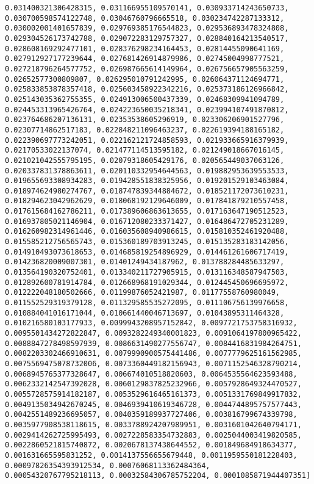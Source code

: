 \documentclass[11pt]{article}
\begin{document}
\begin{Verbatim}[commandchars=\\\{\}]
0.031400321306428315, 0.031166955109570141, 0.030933714243650733, 0.030700598574122748, 0.03046760796665518, 0.030234742287133312, 0.030002001401657839, 0.029769385176544823, 0.029536893478324808, 0.029304526173742788, 0.029072283129757327, 0.028840164213540517, 0.028608169292477101, 0.028376298234164453, 0.02814455090641169, 0.027912927177239644, 0.027681426914879986, 0.02745004998777521, 0.027218796264577752, 0.026987665614149964, 0.026756657905563259, 0.02652577300809807, 0.026295010791242995, 0.026064371124694771, 0.025833853878357418, 0.025603458922342216, 0.025373186126966842, 0.025143035362755355, 0.024913006500437339, 0.02468309941094789, 0.024453313965426764, 0.024223650035218341, 0.023994107491870812, 0.023764686207136131, 0.02353538605296919, 0.023306206901527796, 0.02307714862517183, 0.022848211096463237, 0.022619394188165182, 0.022390697773242051, 0.022162121724858593, 0.021933665916379939, 0.02170533022137074, 0.021477114513595182, 0.021249018667016145, 0.021021042555795195, 0.02079318605429176, 0.020565449037063126, 0.020337831378863611, 0.020110332954644563, 0.019882953639553533, 0.019655693308934283, 0.019428551838325956, 0.019201529103463084, 0.018974624980274767, 0.018747839344884672, 0.018521172073610231, 0.018294623042962629, 0.018068192129646009, 0.017841879210557458, 0.017615684162786211, 0.017389606863613655, 0.017163647190512523, 0.016937805021146904, 0.016712080233371427, 0.016486472705231289, 0.016260982314961446, 0.016035608940986615, 0.015810352461920488, 0.015585212756565743, 0.015360189703913245, 0.015135283183142056, 0.014910493073618653, 0.014685819254896929, 0.014461261606717419, 0.014236820009007301, 0.01401249434187962, 0.013788284485633297, 0.013564190320752401, 0.013340211727905915, 0.013116348587947503, 0.012892600781914784, 0.012668968191029344, 0.012445450696695972, 0.012222048180502666, 0.01199876052421987, 0.01177558760980049, 0.011552529319379128, 0.011329585535272095, 0.011106756139976658, 0.010884041016171044, 0.010661440046713697, 0.01043895311464328, 0.010216580103177933, 0.0099943208957152842, 0.0097721753758316932, 0.0095501434272822847, 0.0093282249340001823, 0.0091064197800965422, 0.0088847278498597939, 0.0086631490277556747, 0.0084416831984264751, 0.0082203302466910631, 0.0079990900575441486, 0.0077779625161562985, 0.0075569475078732006, 0.0073360449182156943, 0.0071152546328790214, 0.0068945765377328647, 0.006674010518820603, 0.0064535564623593488, 0.0062332142547392028, 0.0060129837825232966, 0.0057928649324470527, 0.0055728575914182187, 0.0053529616465161373, 0.0051331769849917832, 0.0049135034942670245, 0.0046939410619346728, 0.0044744895757577443, 0.0042551489236695057, 0.0040359189937727406, 0.003816799674339798, 0.0035977908538118615, 0.0033788924207989951, 0.0031601042640794171, 0.0029414262725995493, 0.0027228583354732883, 0.0025044003419820585, 0.0022860521815740872, 0.0020678137438644552, 0.001849684918634377, 0.001631665595831252, 0.0014137556655679448, 0.0011959550181228403, 0.00097826354393912534, 0.00076068113362484364, 0.00054320767795218113, 0.00032584306785752204, 0.0001085871944407351]

\end{Verbatim}
\end{document}
